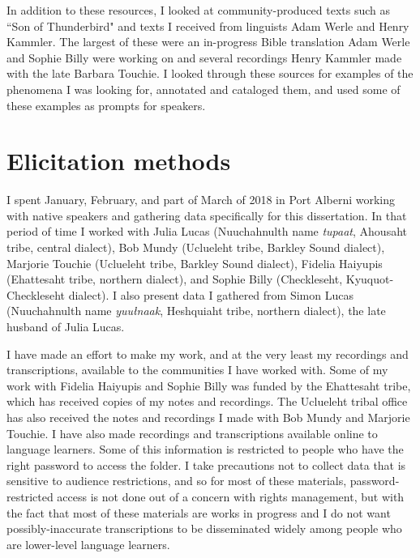 In addition to these resources, I looked at community-produced texts such as ``Son of Thunderbird" and texts I received from linguists Adam Werle and Henry Kammler. The largest of these were an in-progress Bible translation Adam Werle and Sophie Billy were working on and several recordings Henry Kammler made with the late Barbara Touchie. I looked through these sources for examples of the phenomena I was looking for, annotated and cataloged them, and used some of these examples as prompts for speakers.

\section{Elicitation methods} \label{sec:method:elicitation}

I spent January, February, and part of March of 2018 in Port Alberni working with native speakers and gathering data specifically for this dissertation. In that period of time I worked with Julia Lucas (Nuuchahnulth name \textit{tupaat}, Ahousaht tribe, central dialect), Bob Mundy (Uclueleht tribe, Barkley Sound dialect), Marjorie Touchie (Uclueleht tribe, Barkley Sound dialect), Fidelia Haiyupis (Ehattesaht tribe, northern dialect), and Sophie Billy (Checkleseht, Kyuquot-Checkleseht dialect). I also present data I gathered from Simon Lucas (Nuuchahnulth name \textit{yuułnaak}, Heshquiaht tribe, northern dialect), the late husband of Julia Lucas.

I have made an effort to make my work, and at the very least my recordings and transcriptions, available to the communities I have worked with. Some of my work with Fidelia Haiyupis and Sophie Billy was funded by the Ehattesaht tribe, which has received copies of my notes and recordings. The Uclueleht tribal office has also received the notes and recordings I made with Bob Mundy and Marjorie Touchie. I have also made recordings and transcriptions available online to language learners. Some of this information is restricted to people who have the right password to access the folder. I take precautions not to collect data that is sensitive to audience restrictions, and so for most of these materials, password-restricted access is not done out of a concern with rights management, but with the fact that most of these materials are works in progress and I do not want possibly-inaccurate transcriptions to be disseminated widely among people who are lower-level language learners.

